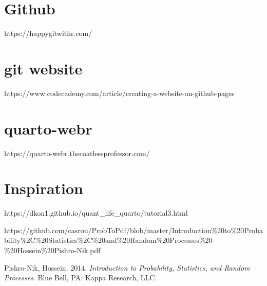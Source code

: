 \documentclass[
  letterpaper,
  DIV=11,
  numbers=noendperiod]{scrreprt}
\newlength{\cslhangindent}
\newenvironment{CSLReferences}[2] %
 {\begin{list}{}{%
  \setlength{\itemindent}{0pt}
  \setlength{\leftmargin}{0pt}
  \setlength{\parsep}{0pt}
  \ifodd #1
   \setlength{\leftmargin}{\cslhangindent}
   \setlength{\itemindent}{-1\cslhangindent}
  \fi
  \setlength{\itemsep}{#2\baselineskip}}}
 {\end{list}}
\begin{document}
\section{Github}\label{github}

https://happygitwithr.com/

\section{git website}\label{git-website}

https://www.codecademy.com/article/creating-a-website-on-github-pages

\section{\texorpdfstring{\textbf{quarto-webr}}{quarto-webr}}\label{quarto-webr}

https://quarto-webr.thecoatlessprofessor.com/

\section{Inspiration}\label{inspiration}

https://dkon1.github.io/quant\_life\_quarto/tutorial3.html

https://github.com/casrou/ProbToPdf/blob/master/Introduction\%20to\%20Probability\%2C\%20Statistics\%2C\%20and\%20Random\%20Processes\%20-\%20Hossein\%20Pishro-Nik.pdf

\label{refs}
\begin{CSLReferences}{1}{0}
Pishro-Nik, Hossein. 2014. \emph{Introduction to Probability,
Statistics, and Random Processes}. Blue Bell, PA: Kappa Research, LLC.

\end{CSLReferences}
\end{document}
